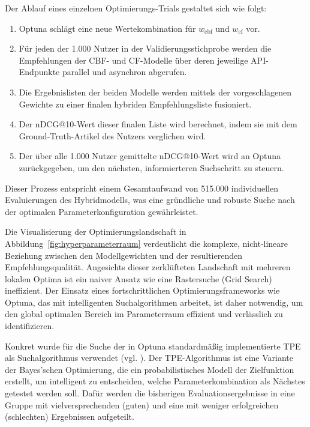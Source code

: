 Der Ablauf eines einzelnen Optimierungs-Trials gestaltet sich wie folgt:
\begin{enumerate}
    \item Optuna schlägt eine neue Wertekombination für $w_\mathrm{cbf}$ und $w_\mathrm{cf}$ vor.
    \item Für jeden der 1.000 Nutzer in der Validierungsstichprobe werden die Empfehlungen der 
    \ac{CBF}- und \ac{CF}-Modelle über deren jeweilige API-Endpunkte parallel und asynchron abgerufen.
    \item Die Ergebnislisten der beiden Modelle werden mittels der vorgeschlagenen Gewichte zu einer 
    finalen hybriden Empfehlungsliste fusioniert.
    \item Der nDCG@10-Wert dieser finalen Liste wird berechnet, indem sie mit dem Ground-Truth-Artikel 
    des Nutzers verglichen wird.
    \item Der über alle 1.000 Nutzer gemittelte nDCG@10-Wert wird an Optuna zurückgegeben, um 
    den nächsten, informierteren Suchschritt zu steuern.
\end{enumerate}

Dieser Prozess entspricht einem Gesamtaufwand von 515.000 individuellen Evaluierungen des 
Hybridmodells, was eine gründliche und robuste Suche nach der optimalen Parameterkonfiguration 
gewährleistet.

Die Visualisierung der Optimierungslandschaft in Abbildung~\ref{fig:hyperparameterraum} verdeutlicht die 
komplexe, nicht-lineare Beziehung zwischen den Modellgewichten und der resultierenden Empfehlungsqualität. 
Angesichts dieser zerklüfteten Landschaft mit mehreren lokalen Optima ist ein naiver Ansatz wie eine 
Rastersuche (Grid Search) ineffizient. Der Einsatz eines fortschrittlichen Optimierungsframeworks 
wie Optuna, das mit intelligenten Suchalgorithmen arbeitet, ist daher notwendig, um den global 
optimalen Bereich im Parameterraum effizient und verlässlich zu identifizieren.



Konkret wurde für die Suche der in Optuna standardmäßig implementierte \ac{TPE} als Suchalgorithmus verwendet (vgl. \cite{Akiba_Optuna_2019}). Der TPE-Algorithmus ist eine 
Variante der Bayes'schen Optimierung, die ein probabilistisches Modell der Zielfunktion erstellt, 
um intelligent zu entscheiden, welche Parameterkombination als Nächstes getestet werden soll. 
Dafür werden die bisherigen Evaluationsergebnisse in eine Gruppe mit vielversprechenden (guten) 
und eine mit weniger erfolgreichen (schlechten) Ergebnissen aufgeteilt.


